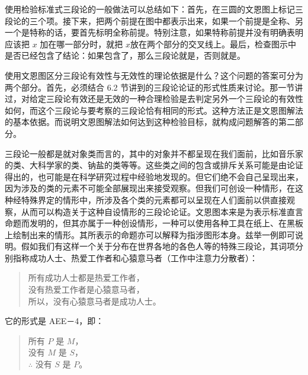 \begin{theorembox}[title=文恩图检验三段论的一般步骤]
使用检验标准式三段论的一般做法可以总结如下：首先，在三圆的文恩图上标记三段论的三个项。接下来，把两个前提在图中都表示出来，如果一个前提是全称、另一个是特称的话，要首先标明全称前提。特别注意，如果特称前提并没有明确表明应该把 $x$ 加在哪一部分时，就把 $x$放在两个部分的交叉线上。最后，检查图示中是否已经包含了结论：如果包含了，那么三段论就是，否则就是。
\end{theorembox}

使用文恩图区分三段论有效性与无效性的理论依据是什么？这个问题的答案可分为两个部分。首先，必须结合 6.2 节讲到的三段论论证的形式性质来讨论。那一节讲过，对给定三段论有效还是无效的一种合理检验是去判定另外一个三段论的有效性如何，而这个三段论与要考察的三段论恰有相同的形式。这种方法正是文恩图解法的基本依据。而说明文恩图解法如何达到这种检验目标，就构成问题解答的第二部分。

三段论一般都是就对象类而言的，其中的对象并不都呈现在我们面前，比如音乐家的类、大科学家的类、钠盐的类等等。这些类之间的包含或排斥关系可能是由论证得出的，也可能是在科学研究过程中经验地发现的。但它们绝不会自己呈现出来，因为涉及的类的元素不可能全部展现出来接受观察。但我们可创设一种情形，在这种经特殊界定的情形中，所涉及各个类的元素都可以呈现在人们面前以供直接观察，从而可以构造关于这种自设情形的三段论论证。文恩图本来是为表示标准直言命题而发明的，但其亦属于一种创设情形，一种可以使用各种工具在纸上、在黑板上绘制出来的情形。其所表示的命题亦可以解释为指涉图形本身。兹举一例即可说明。假如我们有这样一个关于分布在世界各地的各色人等的特殊三段论，其词项分别指称成功人士、热爱工作者和心猿意马者（工作中注意力分散者）：

\begin{quote}
所有成功人士都是热爱工作者，\\
没有热爱工作者是心猿意马者，\\
所以，没有心猿意马者是成功人士。
\end{quote}

它的形式是 AEE－4，即：

\begin{quote}
所有 $P$ 是 $M$，\\
没有 $M$ 是 $S$，\\
$\therefore$ 没有 $S$ 是 $P$。
\end{quote}


